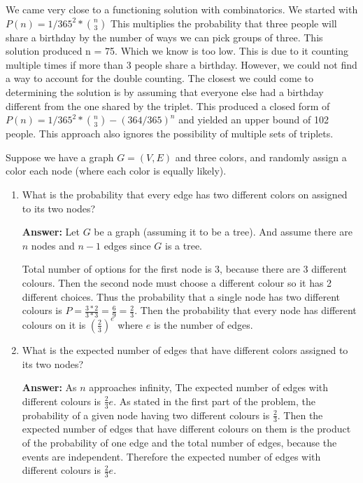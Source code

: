 \documentclass{article}
\begin{document}
We came very close to a functioning solution with combinatorics. We started with $P(n) = 1/365^2 *  {n \choose 3}$ This multiplies the probability that three people will share a birthday by the number of ways we can pick groups of three. This solution produced n = 75. Which we know is too low. This is due to it counting multiple times if more than 3 people share a birthday. However, we could not find a way to account for the double counting. The closest we could come to determining the solution is by assuming that everyone else had a birthday different from the one shared by the triplet. This produced a closed form of $P(n) = 1/365^2 * {n \choose 3}- (364/365)^n$ and yielded an upper bound of 102 people. This approach also ignores the possibility of multiple sets of triplets. 


\nextprob
Suppose we have a graph $G=(V,E)$ and three colors, and randomly assign a color
each node (where each color is equally likely).
\begin{enumerate}
   \item What is the probability that every edge has two different colors on
        assigned to its two nodes?
        
        \textbf{Answer:} Let $G$ be a graph (assuming it to be a tree). And assume there are $n$ nodes and $n-1$ edges since $G$ is a tree.
        
        Total number of options for the first node is 3, because there are 3 different colours. Then the second node must choose a different colour so it has 2 different choices. Thus the probability that a single node has two different colours is $P = \frac{3*2}{3*3} = \frac{6}{9} = \frac{2}{3}$. Then the probability that every node has different colours on it is $(\frac{2}{3})^e$ where $e$ is the number of edges.
               
    \item What is the expected number of edges that have different colors
        assigned to its two nodes?
        
        \textbf{Answer:} As $n$ approaches infinity, The expected number of edges with different colours is $\frac{2}{3} e$. As stated in the first part of the problem, the probability of a given node having two different colours is $\frac{2}{3}$. Then the expected number of edges that have different colours on them is the product of the probability of one edge and the total number of edges, because the events are independent. Therefore the expected number of edges with different colours is $\frac{2}{3} e$.
        
\end{enumerate}
\end{document}
